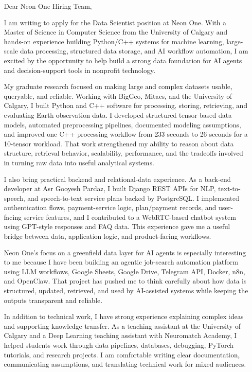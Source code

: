 \documentclass[11pt]{letter}
\begin{document}
\begin{letter}{}

\opening{Dear Neon One Hiring Team,}

I am writing to apply for the Data Scientist position at Neon One. With a Master of Science in Computer Science from the University of Calgary and hands-on experience building Python/C++ systems for machine learning, large-scale data processing, structured data storage, and AI workflow automation, I am excited by the opportunity to help build a strong data foundation for AI agents and decision-support tools in nonprofit technology.

My graduate research focused on making large and complex datasets usable, queryable, and reliable. Working with BigGeo, Mitacs, and the University of Calgary, I built Python and C++ software for processing, storing, retrieving, and evaluating Earth observation data. I developed structured tensor-based data models, automated preprocessing pipelines, documented modeling assumptions, and improved one C++ processing workflow from 233 seconds to 26 seconds for a 10-tensor workload. That work strengthened my ability to reason about data structure, retrieval behavior, scalability, performance, and the tradeoffs involved in turning raw data into useful analytical systems.

I also bring practical backend and relational-data experience. As a back-end developer at Asr Gooyesh Pardaz, I built Django REST APIs for NLP, text-to-speech, and speech-to-text service plans backed by PostgreSQL. I implemented authentication flows, payment-service logic, plan/payment records, and user-facing service features, and I contributed to a WebRTC-based chatbot system using GPT-style responses and FAQ data. This experience gave me a useful bridge between data, application logic, and product-facing workflows.

Neon One's focus on a greenfield data layer for AI agents is especially interesting to me because I have been building an agentic job-search automation platform using LLM workflows, Google Sheets, Google Drive, Telegram API, Docker, n8n, and OpenClaw. That project has pushed me to think carefully about how data is structured, updated, retrieved, and used by AI-assisted systems while keeping the outputs transparent and reliable.

In addition to technical work, I have strong experience explaining complex ideas and supporting knowledge transfer. As a teaching assistant at the University of Calgary and a Deep Learning teaching assistant with Neuromatch Academy, I helped students work through data pipelines, databases, debugging, PyTorch tutorials, and research projects. I am comfortable writing clear documentation, communicating assumptions, and translating technical work for mixed audiences.


\end{letter}
\end{document}
